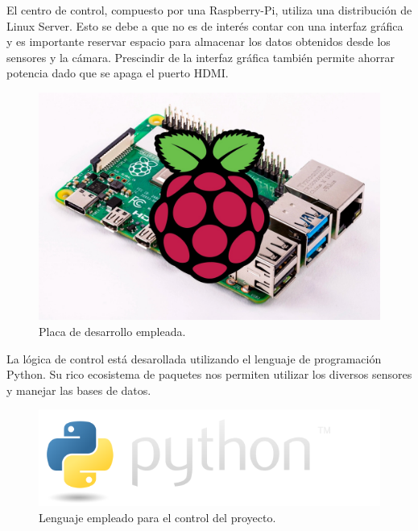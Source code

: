 El centro de control, compuesto por una Raspberry-Pi, utiliza una distribución de Linux Server. Esto se debe a que no es de interés contar con una interfaz gráfica y es importante reservar espacio para almacenar los datos obtenidos desde los sensores y la cámara. 
Prescindir de la interfaz gráfica también permite ahorrar potencia dado que se apaga el puerto HDMI.

\begin{figure}[H]
	\centering
	\includegraphics[width=0.7\linewidth]{"../Ingenieria de Detalle/ImagenesIngenieria de Detalle/rpi_with_board"}
	\caption{Placa de desarrollo empleada.}
\end{figure}



La lógica de control está desarollada utilizando el lenguaje de programación Python. Su rico ecosistema de paquetes nos permiten utilizar los diversos sensores y manejar las bases de datos.

\begin{figure}[H]
	\centering
	\includegraphics[width=0.7\linewidth]{"../Ingenieria de Detalle/ImagenesIngenieria de Detalle/python-logo@2x"}
	\caption{Lenguaje empleado para el control del proyecto.}
\end{figure}










